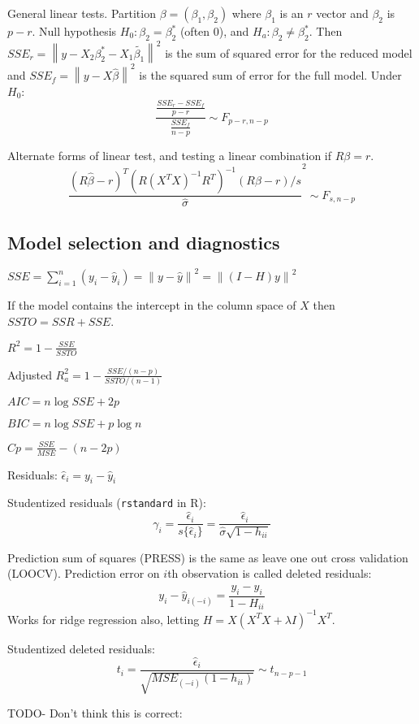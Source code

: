 \documentclass[10pt, twocolumn]{article}
\newcommand{\norm}[1]{\left\lVert#1\right\rVert}
\begin{document}
General linear tests. Partition $\beta = (\beta_1, \beta_2)$ where $\beta_1$
is an $r$ vector and $\beta_2$ is $p - r$. Null hypothesis $H_0: \beta_2 =
\beta_2^*$ (often 0), and $H_a: \beta_2 \neq \beta_2^*$. Then
$SSE_r = \norm{y - X_2 \beta_2^* - X_1 \tilde{\beta_1}}^2$ is the sum of
squared error for the reduced model and 
$SSE_f = \norm{y - X \hat{\beta}}^2$ is the squared sum of error for the
full model.
Under $H_0$:
\[
    \frac{\frac{SSE_r - SSE_f}{p - r}}
         {\frac{SSE_f}{n - p}}
         \sim F_{p-r, n-p}
\]

Alternate forms of linear test, and testing a linear combination if $R\beta
= r$.
\[
    \frac{(R \hat{\beta} - r)^T (R(X^T X)^{-1} R^T)^{-1} (R \beta - r) / s}
    {\hat{\sigma}}^2 \sim F_{s, n-p}
\]

\subsection{Model selection and diagnostics}

$SSE = \sum_{i=1}^n (y_i - \hat{y}_i) = \norm{y - \hat{y}}^2
        = \norm{(I - H)y}^2$

If the model contains the intercept in the column space of $X$  then $SSTO = SSR + SSE$.

$R^2 = 1 - \frac{SSE}{SSTO}$

Adjusted $R^2_a = 1 - \frac{SSE / (n-p)}{SSTO / (n-1)}$

$AIC = n \log SSE + 2p$

$BIC = n \log SSE + p \log n$

$Cp = \frac{SSE}{MSE} - (n - 2p)$

Residuals: $\hat{\epsilon}_i = y_i - \hat{y}_i$

Studentized residuals (\texttt{rstandard} in R): 
\[
    \gamma_i =
    \frac{\hat{\epsilon}_i}{ s \{ \hat{\epsilon}_i \} } = 
    \frac{\hat{\epsilon}_i}{\hat{\sigma} \sqrt{1 - h_{ii}}}
\]

Prediction sum of squares (PRESS) is the same as leave one out cross
validation (LOOCV). Prediction error on $i$th observation is called deleted
residuals:
\[
    y_i - \hat{y}_{i (-i)} = \frac{y_i - \hat{y}_i}{1 - H_{ii}}
\]
Works for ridge regression also, letting 
$H = X(X^T X + \lambda I)^{-1} X^T$.

Studentized deleted residuals: 
\[
    t_i = \frac{\hat{\epsilon}_i}{\sqrt{MSE_{(-i)} (1 - h_{ii})}} \sim t_{n - p -1}
\]

TODO- Don't think this is correct:
\end{document}
